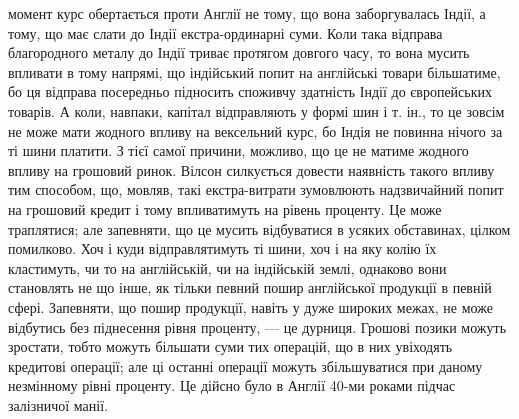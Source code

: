момент курс обертається проти Англії не тому, що вона заборгувалась Індії, а
тому, що має слати до Індії екстра-ординарні суми. Коли така відправа благородного
металу до Індії триває протягом довгого часу, то вона мусить впливати
в тому напрямі, що індійський попит на англійські товари більшатиме, бо ця
відправа посередньо підносить споживчу здатність Індії до європейських товарів.
А коли, навпаки, капітал відправляють у формі шин і т. ін., то це зовсім не
може мати жодного впливу на вексельний курс, бо Індія не повинна нічого за
ті шини платити. З тієї самої причини, можливо, що це не матиме жодного
впливу на грошовий ринок. Вілсон силкується довести наявність такого впливу
тим способом, що, мовляв, такі екстра-витрати зумовлюють надзвичайний попит
на грошовий кредит і тому впливатимуть на рівень проценту. Це може траплятися;
але запевняти, що це мусить відбуватися в усяких обставинах, цілком
помилково. Хоч і куди відправлятимуть ті шини, хоч і на яку колію їх кластимуть,
чи то на англійській, чи на індійській землі, однаково вони становлять
не що інше, як тільки певний пошир англійської продукції в певній сфері. Запевняти,
що пошир продукції, навіть у дуже широких межах, не може відбутись
без піднесення рівня проценту, — це дурниця. Грошові позики можуть зростати,
тобто можуть більшати суми тих операцій, що в них увіходять кредитові
операції; але ці останні операції можуть збільшуватися при даному незмінному
рівні проценту. Це дійсно було в Англії 40-ми роками підчас залізничої манії.
\parbreak{}  %
